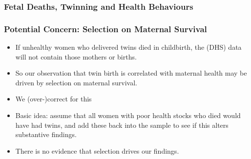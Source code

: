 \documentclass[9pt,letterpaper,subeqn]{beamer}
\begin{document}
\begin{frame}[label=TwinDeathUSA]
  \frametitle{Fetal Deaths, Twinning and Health Behaviours}

\hyperlink{mech}{} \hyperlink{fdgraph}{}
\end{frame}





\begin{frame}[label=selectest]
  \frametitle{Potential Concern: Selection on Maternal Survival}
\begin{itemize}
\item If unhealthy women who delivered twins died in childbirth, the (DHS) data will not contain those mothers or births.
\item So our observation that twin birth is correlated with maternal health may be driven by selection on maternal survival. 
\item We (over-)correct for this
\item Basic idea: assume that all women with poor health stocks who died would have had twins, and add these back into the sample to see if this alters substantive findings. \hyperlink{MMRselec}{} 
\item There is no evidence that selection drives our findings.
\end{itemize}
\end{frame}
\end{document}
